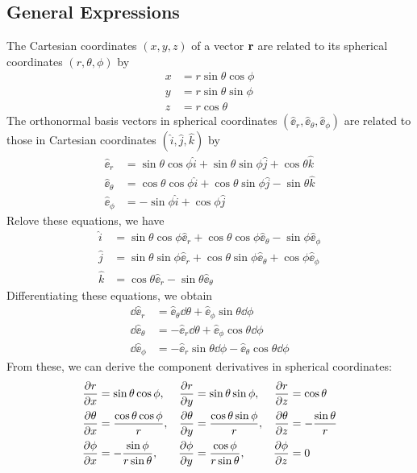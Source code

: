 \subsection{General Expressions} \label{sec:AngularMomentum_SphericalCoord}
The Cartesian coordinates $(x,y,z)$ of a vector $\mathbf{r}$ are related to its spherical coordinates $(r,\theta,\phi)$ by 
\begin{align}
    x & = r \sin \theta \cos \phi \\
    y & = r \sin \theta \sin \phi \\
    z & = r \cos \theta
\end{align}
The orthonormal basis vectors in spherical coordinates $(\hat{\ee}_ r, \hat{\ee}_ \theta, \hat{\ee}_ \phi)$ are related to those in Cartesian coordinates $(\hat i ,\hat j, \hat k)$ by
\begin{align}
    \hat{\ee}_ r & = \sin \theta \cos \phi \hat i + \sin \theta \sin \phi \hat j + \cos \theta \hat k \\
    \hat{\ee}_ \theta & = \cos \theta \cos \phi \hat i + \cos \theta \sin \phi \hat j - \sin \theta \hat k \\
    \hat{\ee}_ \phi & = -\sin \phi \hat i + \cos \phi \hat j
\end{align}
Relove these equations, we have
\begin{align}
    \hat i & = \sin \theta \cos \phi \hat{\ee}_ r + \cos \theta \cos \phi \hat{\ee}_ \theta - \sin \phi \hat{\ee}_ \phi \\
    \hat j & = \sin \theta \sin \phi \hat{\ee}_ r + \cos \theta \sin \phi \hat{\ee}_ \theta + \cos \phi \hat{\ee}_ \phi \\
    \hat k & = \cos \theta \hat{\ee}_ r - \sin \theta \hat{\ee}_ \theta
\end{align}
Differentiating these equations, we obtain
\begin{align}
    \dd \hat{\ee}_ r & = \hat{\ee}_ \theta \dd \theta + \hat{\ee}_ \phi \sin \theta \dd \phi \\
    \dd \hat{\ee}_ \theta & = -\hat{\ee}_ r \dd \theta + \hat{\ee}_ \phi \cos \theta \dd \phi \\
    \dd \hat{\ee}_ \phi & = -\hat{\ee}_ r \sin \theta \dd \phi - \hat{\ee}_ \theta \cos \theta \dd \phi
\end{align}
From these, we can derive the component derivatives in spherical coordinates:
\begin{align}
    \frac{\partial r}{\partial x} & = \sin \theta \cos \phi, & \frac{\partial r}{\partial y} & = \sin \theta \sin \phi, & \frac{\partial r}{\partial z} & = \cos \theta \\
    \frac{\partial \theta}{\partial x} & = \frac{\cos \theta \cos \phi}{r}, & \frac{\partial \theta}{\partial y} & = \frac{\cos \theta \sin \phi}{r}, & \frac{\partial \theta}{\partial z} & = -\frac{\sin \theta}{r} \\
    \frac{\partial \phi}{\partial x} & = -\frac{\sin \phi}{r \sin \theta}, & \frac{\partial \phi}{\partial y} & = \frac{\cos \phi}{r \sin \theta}, & \frac{\partial \phi}{\partial z} & = 0
\end{align}
